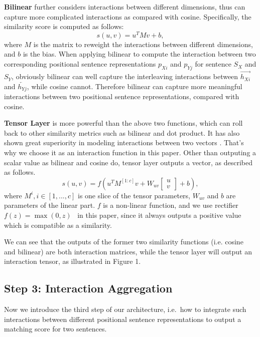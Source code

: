 \documentclass[letterpaper]{article}
\begin{document}
{\bf Bilinear} further considers interactions between different dimensions, thus can capture more complicated interactions as compared with cosine. Specifically, the similarity score is computed as follows:
\begin{equation*}
s(u,v)={u^T}Mv+b,
\end{equation*}
where $M$ is the matrix to reweight the interactions between different dimensions, and $b$ is the bias. When applying bilinear to compute the interaction between two corresponding positional sentence representations $p_{Xi}$ and $p_{Yj}$ for sentence $S_X$ and $S_Y$, obviously bilinear can well capture the interleaving interactions between $\overrightarrow{h_{Xi}}$ and $\overleftarrow{h_{Yj}}$, while cosine cannot. Therefore bilinear can capture more meaningful interactions between two positional sentence representations, compared with cosine.

{\bf Tensor Layer} is more powerful than the above two functions, which can roll back to other similarity metrics such as bilinear and dot product. It has also shown great superiority in modeling interactions between two vectors \cite{socher2013recursive,socher2013reasoning,DBLP:conf/ijcai/QiuH15}. That's why we choose it as an interaction function in this paper.
Other than outputing a scalar value as bilinear and cosine do, tensor layer outputs a vector, as described as follows.
\begin{equation*}
s(u,v)= f(u^TM^{[1:c]}v+W_{uv}\begin{bmatrix}
		u\\
		v
	\end{bmatrix}+b),
\end{equation*}
where $M^i, i\in[1,...,c]$ is one slice of the tensor parameters, $W_{uv}$ and $b$ are parameters of the linear part. $f$ is a non-linear function, and we use rectifier $f(z)=\max(0,z)$~\cite{glorot2011deep} in this paper, since it always outputs a positive value which is compatible as a similarity.

We can see that the outputs of the former two similarity functions (i.e. cosine and bilinear) are both interaction matrices,
while the tensor layer will output an interaction tensor, as illustrated in Figure 1.

\subsection{Step 3: Interaction Aggregation}

Now we introduce the third step of our architecture, i.e.~how to integrate such interactions between different positional sentence representations to output a matching score for two sentences.
\end{document}
